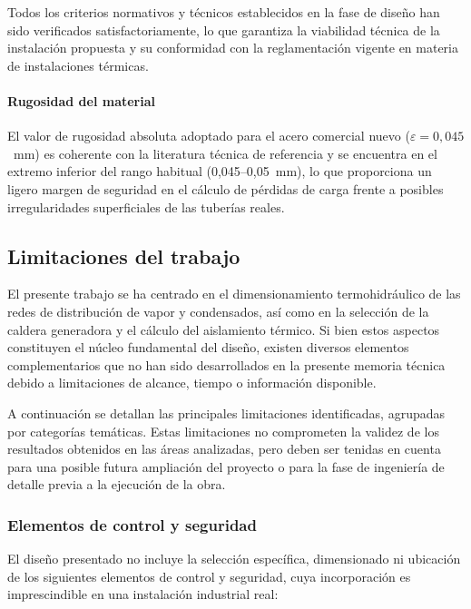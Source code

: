 Todos los criterios normativos y técnicos establecidos en la fase de diseño han sido verificados satisfactoriamente, lo que garantiza la viabilidad técnica de la instalación propuesta y su conformidad con la reglamentación vigente en materia de instalaciones térmicas.

\paragraph{Rugosidad del material}

El valor de rugosidad absoluta adoptado para el acero comercial nuevo ($\varepsilon = 0{,}045$~mm) es coherente con la literatura técnica de referencia y se encuentra en el extremo inferior del rango habitual (0,045--0,05~mm), lo que proporciona un ligero margen de seguridad en el cálculo de pérdidas de carga frente a posibles irregularidades superficiales de las tuberías reales.

\subsection{Limitaciones del trabajo}
\label{subsec:limitaciones}

El presente trabajo se ha centrado en el dimensionamiento termohidráulico de las redes de distribución de vapor y condensados, así como en la selección de la caldera generadora y el cálculo del aislamiento térmico. Si bien estos aspectos constituyen el núcleo fundamental del diseño, existen diversos elementos complementarios que no han sido desarrollados en la presente memoria técnica debido a limitaciones de alcance, tiempo o información disponible.

A continuación se detallan las principales limitaciones identificadas, agrupadas por categorías temáticas. Estas limitaciones no comprometen la validez de los resultados obtenidos en las áreas analizadas, pero deben ser tenidas en cuenta para una posible futura ampliación del proyecto o para la fase de ingeniería de detalle previa a la ejecución de la obra.

\subsubsection{Elementos de control y seguridad}
\label{subsubsec:limitaciones-control-seguridad}

El diseño presentado no incluye la selección específica, dimensionado ni ubicación de los siguientes elementos de control y seguridad, cuya incorporación es imprescindible en una instalación industrial real:

